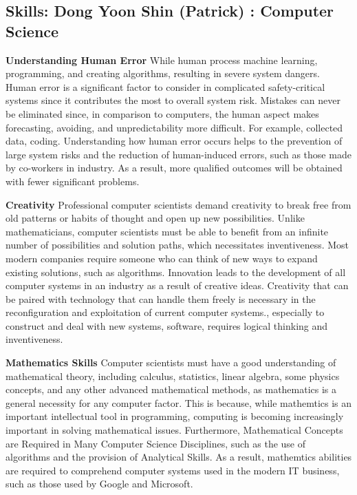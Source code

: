 \documentclass[a4paper, 11pt]{report}
\begin{document}
\subsection{Skills: Dong Yoon Shin (Patrick) : Computer Science}

\textbf{Understanding Human Error}
  While human process machine learning, programming, and creating algorithms, resulting in severe system dangers. Human error is a significant factor to consider in complicated safety-critical systems since it contributes the most to overall system risk. Mistakes can never be eliminated since, in comparison to computers, the human aspect makes forecasting, avoiding, and unpredictability more difficult. For example, collected data, coding. Understanding how human error occurs helps to the prevention of large system risks and the reduction of human-induced errors, such as those made by co-workers in industry. As a result, more qualified outcomes will be obtained with fewer significant problems.

\textbf{Creativity}
  Professional computer scientists demand creativity to break free from old patterns or habits of thought and open up new possibilities. Unlike mathematicians, computer scientists must be able to benefit from an infinite number of possibilities and solution paths, which necessitates inventiveness. Most modern companies require someone who can think of new ways to expand existing solutions, such as algorithms. Innovation leads to the development of all computer systems in an industry as a result of creative ideas. Creativity that can be paired with technology that can handle them freely is necessary in the reconfiguration and exploitation of current computer systems., especially to construct and deal with new systems, software, requires logical thinking and inventiveness.

\textbf{Mathematics Skills}
  Computer scientists must have a good understanding of mathematical theory, including calculus, statistics, linear algebra, some physics concepts, and any other advanced mathematical methods, as mathematics is a general necessity for any computer factor. This is because, while mathemtics is an important intellectual tool in programming, computing is becoming increasingly important in solving mathematical issues. Furthermore, Mathematical Concepts are Required in Many Computer Science Disciplines, such as the use of algorithms and the provision of Analytical Skills. As a result, mathemtics abilities are required to comprehend computer systems used in the modern IT business, such as those used by Google and Microsoft.
\end{document}
